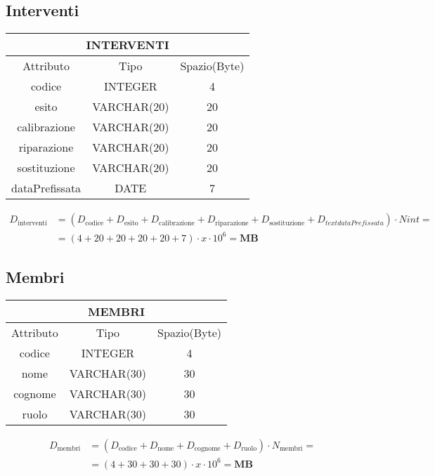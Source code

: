 \subsection{Interventi}
\begin{tabular}{ |c|c|c|}
  \hline
  \multicolumn{3}{|c|}{\textbf{INTERVENTI}} \\
  \hline
  Attributo & Tipo & Spazio(Byte) \\
  \hline
  codice & INTEGER & 4 \\
  esito & VARCHAR(20) & 20 \\
  calibrazione & VARCHAR(20) & 20 \\
  riparazione & VARCHAR(20) & 20 \\
  sostituzione & VARCHAR(20) & 20 \\
  dataPrefissata & DATE & 7 \\
  \hline
\end{tabular}
\begin{equation}
  \begin{aligned}
    D_{\text{interventi}} &=(D_{\text{codice}} + D_{\text{esito}} +D_{\text{calibrazione}} +D_{\text{riparazione}} + D_{\text{sostituzione}} + D_{text{dataPrefissata}}) \cdot  Nint =\\
    &=(4+20+20+20+20+7)\cdot x\cdot 10^6= \textbf{MB}
  \end{aligned}
\end{equation}
\subsection{Membri}
\begin{tabular}{ |c|c|c|}
  \hline
  \multicolumn{3}{|c|}{\textbf{MEMBRI}}\\
  \hline
  Attributo & Tipo & Spazio(Byte) \\
  \hline
  codice & INTEGER & 4 \\
  nome & VARCHAR(30) & 30 \\
  cognome & VARCHAR(30) & 30 \\
  ruolo & VARCHAR(30) & 30\\
  \hline
\end{tabular}
\begin{equation}
  \begin{aligned}
    D_{\text{membri}} &=(D_{\text{codice}} + D_{\text{nome}} +D_{\text{cognome}} +D_{\text{ruolo}}) \cdot  N_{\text{membri}} =\\
    &=(4+30+30+30) \cdot x\cdot 10^6= \textbf{MB}
  \end{aligned}
\end{equation}
